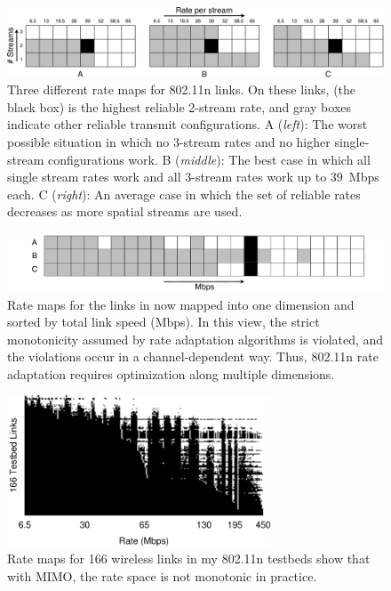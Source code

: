 \begin{figure}[t]
      \centering
      \includegraphics[width=\textwidth]{figures/approach/rate_table_2d.pdf}
      \caption[Three different rate maps for 802.11n links]{\label{fig:rate_table_2d}Three different rate maps for 802.11n links. On these links,  (the black box) is the highest reliable 2-stream rate, and gray boxes indicate other reliable transmit configurations. A (\emph{left}): The worst possible situation in which no 3-stream rates and no higher single-stream configurations work. B (\emph{middle}): The best case in which all single stream rates work and all 3-stream rates work up to 39~Mbps each. C (\emph{right}): An average case in which the set of reliable rates decreases as more spatial streams are used.}
\end{figure}
\begin{figure}[t]
      \centering
      \includegraphics[width=\textwidth]{figures/approach/rate_table_1d.pdf}
      \caption[Rate maps for the links in  mapped into one dimension]{\label{fig:rate_table_1d}Rate maps for the links in  now mapped into one dimension and sorted by total link speed (Mbps).
      In this view, the strict monotonicity assumed by rate adaptation algorithms is violated, and the violations occur in a channel-dependent way. Thus, 802.11n rate adaptation requires optimization along multiple dimensions.}
\end{figure}

\begin{figure}[t]
      \centering
      \includegraphics[width=0.7\textwidth]{figures/approach/rate_maps.pdf}
      \caption[Rate maps for real 802.11n wireless links]{\label{fig:rate_maps}Rate maps for 166 wireless links in my 802.11n testbeds show that with MIMO, the rate space is not monotonic in practice.}
\end{figure}

